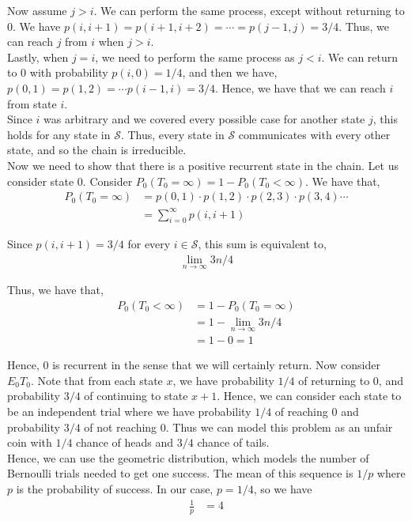 \documentclass[12pt]{article}
\begin{document}
Now assume $j > i$. We can perform the same process, except without returning to $0$. We have $p(i, i+1) = p(i+1, i+2) = \cdots = p(j-1, j) = 3/4$. Thus, we can reach $j$ from $i$ when $j > i$.\\

Lastly, when $j = i$, we need to perform the same process as $j < i$. We can return to $0$ with probability $p(i, 0) = 1/4$, and then we have, $p(0, 1) = p(1, 2) = \cdots p(i-1, i) = 3/4$. Hence, we have that we can reach $i$ from state $i$.\\

Since $i$ was arbitrary and we covered every possible case for another state $j$, this holds for any state in $\mathcal{S}$. Thus, every state in $\mathcal{S}$ communicates with every other state, and so the chain is irreducible.\\

Now we need to show that there is a positive recurrent state in the chain. Let us consider state $0$. Consider $P_0(T_0 = \infty) = 1 - P_0(T_0 < \infty)$. We have that,
\begin{align*}
P_0(T_0 = \infty) &= p(0, 1) \cdot p(1, 2) \cdot p(2, 3) \cdot p(3, 4) \cdots\\
&= \sum_{i=0}^{\infty} p(i, i+1)
\end{align*}

Since $p(i, i+1) = 3/4$ for every $i \in \mathcal{S}$, this sum is equivalent to,
\begin{align*}
\lim_{n \to \infty} 3n/4
\end{align*}

Thus, we have that,
\begin{align*}
P_0(T_0 < \infty) &= 1 - P_0(T_0 = \infty)\\
&= 1 - \lim_{n \to \infty} 3n/4\\
&= 1 - 0 = 1
\end{align*}

Hence, $0$ is recurrent in the sense that we will certainly return. Now consider $E_0T_0$. Note that from each state $x$, we have probability $1/4$ of returning to $0$, and probability $3/4$ of continuing to state $x+1$. Hence, we can consider each state to be an independent trial where we have probability $1/4$ of reaching $0$ and probability $3/4$ of not reaching $0$. Thus we can model this problem as an unfair coin with $1/4$ chance of heads and $3/4$ chance of tails.\\

Hence, we can use the geometric distribution, which models the number of Bernoulli trials needed to get one success. The mean of this sequence is $1/p$ where $p$ is the probability of success. In our case, $p = 1/4$, so we have
\begin{align*}
\frac{1}{p} &= 4
\end{align*}
\end{document}
